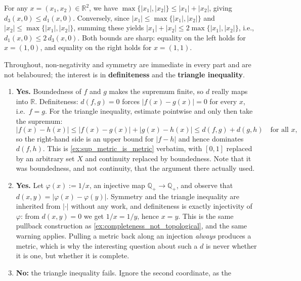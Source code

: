\begin{exercisesolution}
\label{sol:ai_metric_equivalence}
For any $x = (x_1, x_2) \in \mathbb{R}^2$, we have $\max\{|x_1|, |x_2|\} \leq |x_1| + |x_2|$, giving $d_3(x,0) \leq d_1(x,0)$. Conversely, since $|x_1| \leq \max\{|x_1|, |x_2|\}$ and $|x_2| \leq \max\{|x_1|, |x_2|\}$, summing these yields $|x_1| + |x_2| \leq 2 \max\{|x_1|, |x_2|\}$, i.e., $d_1(x,0) \leq 2 \, d_3(x,0)$. Both bounds are sharp: equality on the left holds for $x=(1,0)$, and equality on the right holds for $x=(1,1)$.
\end{exercisesolution}

\begin{exercisesolution}
\label{sol:metric_space_examples}
Throughout, non-negativity and symmetry are immediate in every part and are not belaboured; the
interest is in \textbf{definiteness} and the \textbf{triangle inequality}.
\begin{enumerate}[label=\textbf{(\alph*)}]
  \item \textbf{Yes.} Boundedness of $f$ and $g$ makes the supremum finite, so $d$ really maps
    into $\mathbb{R}$. Definiteness: $d(f,g)=0$ forces $|f(x)-g(x)| = 0$ for every $x$, i.e.\
    $f=g$. For the triangle inequality, estimate pointwise and only then take the supremum:
    \[|f(x)-h(x)| \leq |f(x)-g(x)| + |g(x)-h(x)| \leq d(f,g) + d(g,h) \quad \text{for all } x,\]
    so the right-hand side is an upper bound for $|f-h|$ and hence dominates $d(f,h)$. This is
    \cref{ex:sup_metric_is_metric} verbatim, with $[0,1]$ replaced by an arbitrary set $X$ and
    continuity replaced by boundedness. Note that it was boundedness, and not continuity, that
    the argument there actually used.
  \item \textbf{Yes.} Let $\varphi(x) := 1/x$, an injective map $\mathbb{Q}_+ \to \mathbb{Q}_+$,
    and observe that $d(x,y) = |\varphi(x)-\varphi(y)|$. Symmetry and the triangle inequality
    are inherited from $|\cdot|$ without any work, and definiteness is exactly injectivity of
    $\varphi$: from $d(x,y)=0$ we get $1/x = 1/y$, hence $x=y$. This is the same pullback
    construction as \cref{ex:completeness_not_topological}, and the same warning applies. Pulling
    a metric back along an injection \emph{always} produces a metric, which is why the interesting
    question about such a $d$ is never whether it is one, but whether it is complete.
  \item \textbf{No:} the triangle inequality fails. Ignore the second coordinate, as the

\end{enumerate}
\end{exercisesolution}
